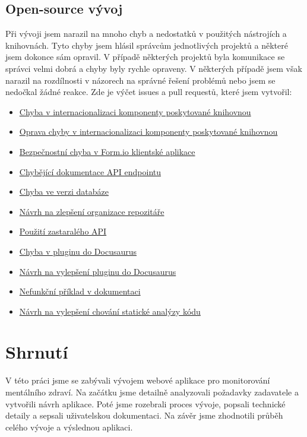\subsection{Open-source vývoj}\label{subsec:open-source-vyvoj}

Při vývoji jsem narazil na mnoho chyb a nedostatků v použitých nástrojích a knihovnách.
Tyto chyby jsem hlásil správcům jednotlivých projektů a některé jsem dokonce sám opravil.
V případě některých projektů byla komunikace se správci velmi dobrá a chyby byly rychle opraveny.
V některých případě jsem však narazil na rozdílnosti v názorech na správné řešení problémů nebo jsem se nedočkal žádné reakce.
Zde je výčet issues a pull requestů, které jsem vytvořil:

\begin{itemize}
    \item
    \href{https://github.com/formio/react/issues/522}{Chyba v internacionalizaci komponenty poskytované knihovnou}
    \item
    \href{https://github.com/formio/react/pull/538}{Oprava chyby v internacionalizaci komponenty poskytované knihovnou}
    \item
    \href{https://github.com/formio/formio-app-formio/issues/35}{Bezpečnostní chyba v Form.io klientské aplikace}
    \item
    \href{https://github.com/formio/formio/issues/1555}{Chybějící dokumentace API endpointu}
    \item
    \href{https://github.com/formio/formio/issues/1485}{Chyba ve verzi databáze}
    \item
    \href{https://github.com/formio/formio-app-formio/issues/34}{Návrh na zlepšení organizace repozitáře}
    \item
    \href{https://github.com/formio/react/issues/523}{Použití zastaralého API}
    \item
    \href{https://github.com/tgreyuk/typedoc-plugin-markdown/issues/429}{Chyba v pluginu do Docusaurus}
    \item
    \href{https://github.com/tgreyuk/typedoc-plugin-markdown/issues/440}{Návrh na vylepšení pluginu do Docusaurus}
    \item
    \href{https://github.com/react-bootstrap/react-bootstrap/issues/6671}{Nefunkční příklad v dokumentaci}
    \item
    \href{https://github.com/gajus/eslint-plugin-jsdoc/issues/1138}{Návrh na vylepšení chování statické analýzy kódu}
\end{itemize}


\section{Shrnutí}\label{sec:shrnuti}

V této práci jsme se zabývali vývojem webové aplikace pro monitorování mentálního zdraví.
Na začátku jsme detailně analyzovali požadavky zadavatele a vytvořili návrh aplikace.
Poté jsme rozebrali proces vývoje, popsali technické detaily a sepsali uživatelskou dokumentaci.
Na závěr jsme zhodnotili průběh celého vývoje a výslednou aplikaci.